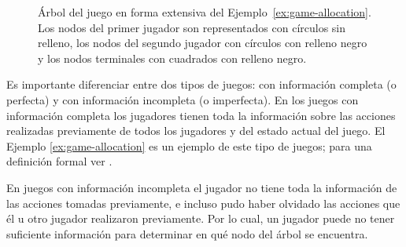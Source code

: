 \begin{figure}[h]
\begin{center}
\caption{Árbol del juego en forma extensiva del Ejemplo~\ref{ex:game-allocation}. Los nodos del primer jugador son representados con círculos sin relleno, los nodos del segundo jugador con círculos con relleno negro y los nodos terminales con cuadrados con relleno negro.}
\label{fig:game-allocation}
\end{center}
\end{figure}

Es importante diferenciar entre dos tipos de juegos: con información completa (o perfecta) y con información incompleta (o imperfecta). En los juegos con información completa los jugadores tienen toda la información sobre las acciones realizadas previamente de todos los jugadores y del estado actual del juego. El Ejemplo \ref{ex:game-allocation} es un ejemplo de este tipo de juegos; para una definición formal ver \cite[pp. 89--90]{bib:course-game-theory}.

En juegos con información incompleta el jugador no tiene toda la información de las acciones tomadas previamente, e incluso pudo haber olvidado las acciones que él u otro jugador realizaron previamente. Por lo cual, un jugador puede no tener suficiente información para determinar en qué nodo del árbol se encuentra. 

